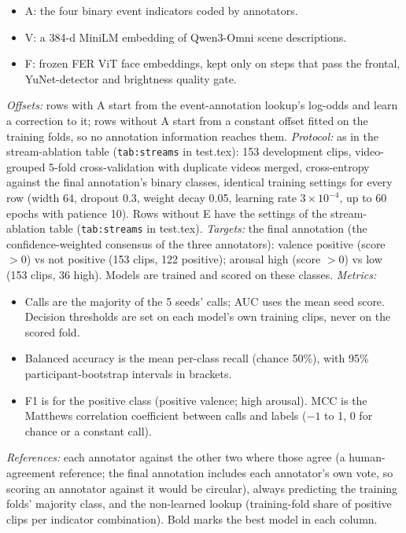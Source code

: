 \documentclass[11pt]{article}
\newcommand{\code}[1]{\texttt{#1}}
\begin{document}
\begin{table}[!htbp]
{\begin{itemize}
  \item A: the four binary event indicators coded by annotators.
  \item V: a 384-d MiniLM embedding of Qwen3-Omni scene descriptions.
  \item F: frozen FER ViT face embeddings, kept only on steps that pass the frontal, YuNet-detector and brightness quality gate.
\end{itemize}
\emph{Offsets:} rows with A start from the event-annotation lookup's log-odds and learn a correction to it; rows without A start from a constant offset fitted on the training folds, so no annotation information reaches them.
\emph{Protocol:} as in the stream-ablation table (\code{tab:streams} in test.tex): 153 development clips, video-grouped 5-fold cross-validation with duplicate videos merged, cross-entropy against the final annotation's binary classes, identical training settings for every row (width 64, dropout 0.3, weight decay 0.05, learning rate $3\times10^{-4}$, up to 60 epochs with patience 10). Rows without E have the settings of the stream-ablation table (\code{tab:streams} in test.tex).
\emph{Targets:} the final annotation (the confidence-weighted consensus of the three annotators): valence positive (score $> 0$) vs not positive (153 clips, 122 positive); arousal high (score $> 0$) vs low (153 clips, 36 high). Models are trained and scored on these classes.
\emph{Metrics:}
\begin{itemize}
  \item Calls are the majority of the 5 seeds' calls; AUC uses the mean seed score. Decision thresholds are set on each model's own training clips, never on the scored fold.
  \item Balanced accuracy is the mean per-class recall (chance 50\%), with 95\% participant-bootstrap intervals in brackets.
  \item F1 is for the positive class (positive valence; high arousal). MCC is the Matthews correlation coefficient between calls and labels ($-1$ to 1, 0 for chance or a constant call).
\end{itemize}
\emph{References:} each annotator against the other two where those agree (a human-agreement reference; the final annotation includes each annotator's own vote, so scoring an annotator against it would be circular), always predicting the training folds' majority class, and the non-learned lookup (training-fold share of positive clips per indicator combination). Bold marks the best model in each column.}
\end{table}
\end{document}
